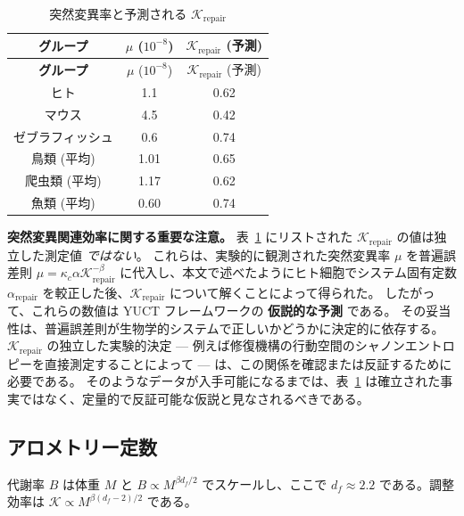 \documentclass[12pt,a4paper]{ltjsarticle}
\newcommand{\REL}{\mathcal{K}}          %
\begin{document}
	\begin{longtable}{|c|c|c|}
		\caption{突然変異率と予測される \(\REL_{\mathrm{repair}}\)}\label{tab:mutations}\\
		\hline
		\textbf{グループ} & \(\mu\) (\(10^{-8}\)) & \(\REL_{\mathrm{repair}}\) (予測) \\
		\hline
		\endfirsthead
		\hline
		\textbf{グループ} & \(\mu\) (\(10^{-8}\)) & \(\REL_{\mathrm{repair}}\) (予測) \\
		\hline
		\endhead
		\hline
		ヒト & 1.1 & 0.62 \\
		マウス & 4.5 & 0.42 \\
		ゼブラフィッシュ & 0.6 & 0.74 \\
		鳥類 (平均) & 1.01 & 0.65 \\
		爬虫類 (平均) & 1.17 & 0.62 \\
		魚類 (平均) & 0.60 & 0.74 \\
		\hline
	\end{longtable}
	
	\noindent\textbf{突然変異関連効率に関する重要な注意。}
	表~\ref{tab:mutations} にリストされた \(\REL_{\mathrm{repair}}\) の値は独立した測定値 \emph{ではない}。
	これらは、実験的に観測された突然変異率 \(\mu\) を普遍誤差則 \(\mu = \kappa_c \alpha \REL_{\mathrm{repair}}^{-\beta}\) に代入し、本文で述べたようにヒト細胞でシステム固有定数 \(\alpha_{\mathrm{repair}}\) を較正した後、\(\REL_{\mathrm{repair}}\) について解くことによって得られた。
	したがって、これらの数値は YUCT フレームワークの \textbf{仮説的な予測} である。
	その妥当性は、普遍誤差則が生物学的システムで正しいかどうかに決定的に依存する。
	\(\REL_{\mathrm{repair}}\) の独立した実験的決定 — 例えば修復機構の行動空間のシャノンエントロピーを直接測定することによって — は、この関係を確認または反証するために必要である。
	そのようなデータが入手可能になるまでは、表~\ref{tab:mutations} は確立された事実ではなく、定量的で反証可能な仮説と見なされるべきである。
	
	\subsection{アロメトリー定数}
	\label{sec:allometry}
	代謝率 \(B\) は体重 \(M\) と \(B\propto M^{\beta d_f/2}\) でスケールし、ここで \(d_f\approx2.2\) である。調整効率は \(\REL \propto M^{\beta(d_f-2)/2}\) である。
	
\end{document}
